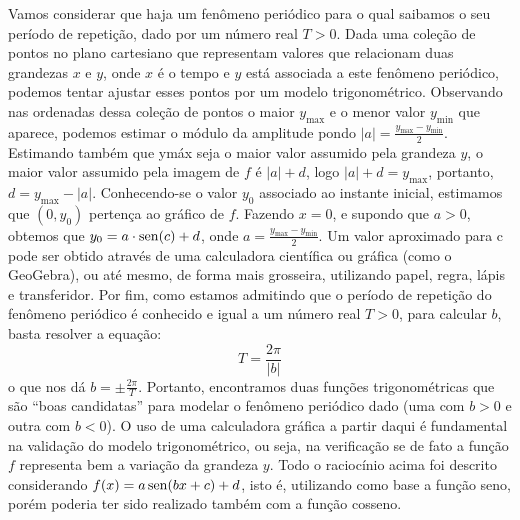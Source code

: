 Vamos considerar que haja um fenômeno periódico para o qual saibamos o seu período de repetição, dado por um número real $T > 0$. Dada uma coleção de pontos no plano cartesiano que representam valores que relacionam duas grandezas $x$ e $y$, onde $x$ é o tempo e $y$ está associada a este fenômeno periódico, podemos tentar ajustar esses pontos por um modelo trigonométrico. Observando nas ordenadas dessa coleção de pontos o maior $y_{\max}$ e o menor valor $y_{\min}$ que aparece, podemos estimar o módulo da amplitude pondo $|a| = \frac{y_{\max}-y_{\min}}{2}$. Estimando também que ymáx seja o maior valor assumido pela grandeza $y$, o maior valor assumido pela imagem de $f$ é $|a|+d$, logo $|a|+d=y_{\max}$, portanto, $d = y_{\max} -|a|$. Conhecendo-se o valor $y_0$ associado ao instante inicial, estimamos que $(0,y_0)$ pertença ao gráfico de $f$. Fazendo $x = 0$, e supondo que $a > 0$, obtemos que $y_0 = a\cdot\operatorname{sen}(c)+d$, onde $a=\frac{y_{\max}-y_{\min}}{2}$. Um valor aproximado para c pode ser obtido através de uma calculadora científica ou gráfica (como o GeoGebra), ou até mesmo, de forma mais grosseira, utilizando papel, regra, lápis e transferidor. Por fim, como estamos admitindo que o período de repetição do fenômeno periódico é conhecido e igual a um número real $T > 0$, para calcular $b$, basta resolver a equação:
\begin{equation*}
T =\frac{2\pi}{|b|} 
\end{equation*}
o que nos dá $b = \pm\frac{2\pi}{T}$. Portanto, encontramos duas funções trigonométricas que são “boas candidatas”{} para modelar o fenômeno periódico dado (uma com $b > 0$ e outra com $b < 0$). O uso de uma calculadora gráfica a partir daqui é fundamental na validação do modelo trigonométrico, ou seja, na verificação se de fato a função $f$ representa bem a variação da grandeza $y$.
Todo o raciocínio acima foi descrito considerando $f(x)= a\operatorname{sen}(bx+c) + d$, isto é, utilizando como base a função seno, porém poderia ter sido realizado também com a função cosseno.


